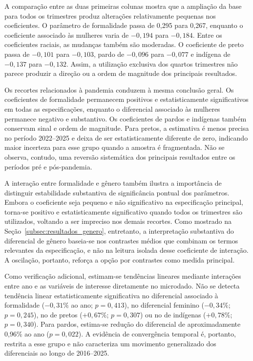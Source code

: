 \documentclass[12pt]{article}
\begin{document}
A comparação entre as duas primeiras colunas mostra que a ampliação da base
para todos os trimestres produz alterações relativamente pequenas nos
coeficientes. O parâmetro de formalidade passa de 0,295 para 0,267, enquanto
o coeficiente associado às mulheres varia de $-0,194$ para $-0,184$. Entre os
coeficientes raciais, as mudanças também são moderadas. O coeficiente de preto passa de
$-0,101$ para $-0,103$, pardo de $-0,096$ para $-0,077$ e indígena de
$-0,137$ para $-0,132$. Assim, a utilização exclusiva dos quartos trimestres
não parece produzir a direção ou a ordem de magnitude dos principais
resultados.

Os recortes relacionados à pandemia conduzem à mesma conclusão geral. Os
coeficientes de formalidade permanecem positivos e estatisticamente
significativos em todas as especificações, enquanto o diferencial associado
às mulheres permanece negativo e substantivo. Os coeficientes de pardos e
indígenas também conservam sinal e ordem de magnitude. Para pretos, a
estimativa é menos precisa no período 2022--2025 e deixa de ser
estatisticamente diferente de zero, indicando maior incerteza para esse grupo
quando a amostra é fragmentada. Não se observa, contudo, uma reversão
sistemática dos principais resultados entre os períodos pré e pós-pandemia.

A interação entre formalidade e gênero também ilustra a importância de
distinguir estabilidade substantiva de significância pontual dos parâmetros.
Embora o coeficiente seja pequeno e não significativo na especificação
principal, torna-se positivo e estatisticamente significativo quando todos os
trimestres são utilizados, voltando a ser impreciso nos demais recortes.
Como mostrado na Seção~\ref{subsec:resultados_genero}, entretanto, a
interpretação substantiva do diferencial de gênero baseia-se nos contrastes
médios que combinam os termos relevantes da especificação, e não na leitura
isolada desse coeficiente de interação. A oscilação, portanto, reforça a opção
por contrastes como medida principal.

Como verificação adicional, estimam-se tendências lineares mediante interações
entre ano e as variáveis de interesse diretamente no microdado. Não se detecta
tendência linear estatisticamente significativa no diferencial associado à
formalidade ($-0,31\%$ ao ano; $p=0,413$), no diferencial feminino
($-0,34\%$; $p=0,245$), no de pretos ($+0,67\%$; $p=0,307$) ou no de
indígenas ($+0,78\%$; $p=0,340$). Para pardos, estima-se redução do
diferencial de aproximadamente 0,96\% ao ano ($p=0,022$). A evidência de
convergência temporal é, portanto, restrita a esse grupo e não caracteriza um
movimento generalizado dos diferenciais ao longo de 2016--2025.
\end{document}
